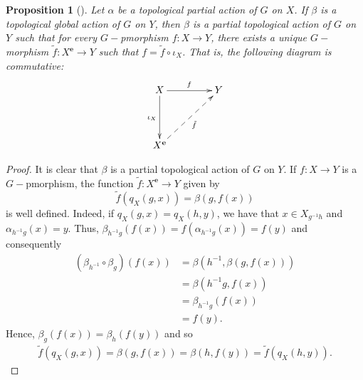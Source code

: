 \documentclass[sn-mathphys-num]{sn-jnl}%
\theoremstyle{thmstyleone}%
\newtheorem{proposition}[theorem]{Proposition}%
\theoremstyle{thmstyletwo}%
\theoremstyle{thmstylethree}%
\begin{document}
\begin{proposition}[\cite{Abadie2}]\label{propuni}
Let  $ \alpha $ be  a topological partial action of $ G $ on $ X $. If $\beta $ is a topological global action of $ G $ on $ Y $, then $ \beta $ is a partial topological action of $ G $ on $ Y $ such that for every $G-$pmorphism $ f: X \to Y $, there exists a unique $G-$morphism $ \tilde{f}: X^\mathbf{e} \to Y $ such that $ f = \tilde{f} \circ \iota_X $. That is, the following diagram is commutative:
$$
\xymatrix@=1.5cm{
X \ar[r]^f \ar[d]_{\iota_X} & Y\\
X^\mathbf{e}\ar@{-->}[ur]_{\tilde{f}}&
}
$$
\end{proposition}
\begin{proof}
It is clear that $\beta$ is a partial topological action of $ G $ on $ Y $.
If $ f: X \to Y $ is a $G-$pmorphism, the function $ \tilde{f}: X^\mathbf {e} \to Y $ given by $$ \tilde {f} (q_X (g, x)) = \beta(g, f (x))$$ is well defined.
Indeed, if $ q_X (g, x) = q_X (h, y) $, we have that $ x \in X_{g^{- 1}h} $ and $ \alpha_ {h^{- 1}g} (x) = y $.
Thus, $ \beta_{h^{- 1} g} (f (x)) = f(\alpha_{h^{- 1} g} (x)) = f (y) $ and consequently
\begin{align*}
(\beta_{h^{-1}}\circ\beta_{g})(f(x))&=\beta(h^{-1},\beta(g,f(x)))\\
&=\beta(h^{-1}g,f(x))\\
&=\beta_{h^{-1}g}(f(x))\\
&=f(y).
\end{align*}
Hence, $\beta_{g}(f(x))=\beta_{h}(f(y))$ and so
\begin{align*}
\tilde{f}(q_X(g,x))=\beta(g,f(x))=\beta(h,f(y))=\tilde{f}(q_X(h,y)).
\end{align*}


\end{proof}
\end{document}

